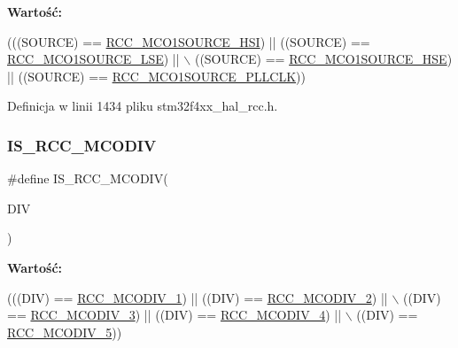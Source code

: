 {\bfseries Wartość\+:}
\begin{DoxyCode}
(((SOURCE) == \hyperlink{group___r_c_c___m_c_o1___clock___source_gad99c388c455852143220397db3730635}{RCC\_MCO1SOURCE\_HSI}) || ((SOURCE) == 
      \hyperlink{group___r_c_c___m_c_o1___clock___source_gaa01b6cb196df3a4ad690f8bcaa4d0621}{RCC\_MCO1SOURCE\_LSE}) || \(\backslash\)
                                   ((SOURCE) == \hyperlink{group___r_c_c___m_c_o1___clock___source_ga5582d2ab152eb440a6cc3ae4833b043f}{RCC\_MCO1SOURCE\_HSE}) || ((SOURCE) == 
      \hyperlink{group___r_c_c___m_c_o1___clock___source_ga79d888f2238eaa4e4b8d02b3900ea18b}{RCC\_MCO1SOURCE\_PLLCLK}))
\end{DoxyCode}


Definicja w linii 1434 pliku stm32f4xx\+\_\+hal\+\_\+rcc.\+h.

\mbox{\label{group___r_c_c___i_s___r_c_c___definitions_ga152403e1f22fd14bb9a5d86406fe593f}} 
\subsubsection{\texorpdfstring{I\+S\+\_\+\+R\+C\+C\+\_\+\+M\+C\+O\+D\+IV}{IS\_RCC\_MCODIV}}
{\footnotesize\ttfamily \#define I\+S\+\_\+\+R\+C\+C\+\_\+\+M\+C\+O\+D\+IV(\begin{DoxyParamCaption}\item[{}]{D\+IV }\end{DoxyParamCaption})}

{\bfseries Wartość\+:}
\begin{DoxyCode}
(((DIV) == \hyperlink{group___r_c_c___m_c_ox___clock___prescaler_ga438d8c3bead4e1ec5dd5757cb0313d53}{RCC\_MCODIV\_1})  || ((DIV) == \hyperlink{group___r_c_c___m_c_ox___clock___prescaler_ga6198330847077f4da351915518140bfc}{RCC\_MCODIV\_2}) || \(\backslash\)
                             ((DIV) == \hyperlink{group___r_c_c___m_c_ox___clock___prescaler_gab9dac03733c3c5bd8877ef43bff3d5f4}{RCC\_MCODIV\_3}) || ((DIV) == 
      \hyperlink{group___r_c_c___m_c_ox___clock___prescaler_ga1bdc2eb56aaeb53dc3ca5cd72f22d4c8}{RCC\_MCODIV\_4}) || \(\backslash\)
                             ((DIV) == \hyperlink{group___r_c_c___m_c_ox___clock___prescaler_ga67292dd05ceb8189ec439d4ac4d58b88}{RCC\_MCODIV\_5}))
\end{DoxyCode}


